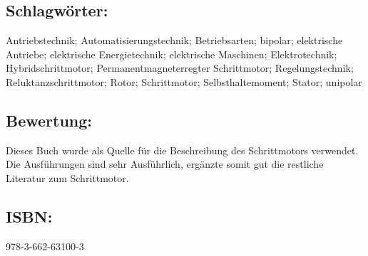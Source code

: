 \subsection*{Schlagwörter:}
Antriebstechnik; Automatisierungstechnik; Betriebsarten; bipolar; elektrische Antriebe; elektrische Energietechnik; elektrische Maschinen; Elektrotechnik; Hybridschrittmotor; Permanentmagneterregter Schrittmotor; Regelungstechnik; Reluktanzschrittmotor; Rotor; Schrittmotor; Selbsthaltemoment; Stator; unipolar
\subsection*{Bewertung:}
Dieses Buch wurde als Quelle für die Beschreibung des Schrittmotors verwendet. Die Ausführungen sind sehr Ausführlich, ergänzte somit gut die restliche Literatur zum Schrittmotor.
\subsection*{ISBN:}
978-3-662-63100-3

